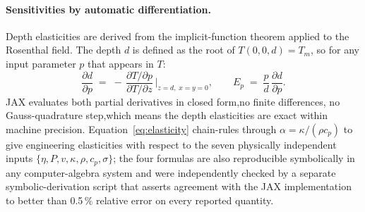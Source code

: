 \documentclass[11pt,a4paper]{article}
\begin{document}
\paragraph{Sensitivities by automatic differentiation.}
Depth elasticities are derived from the implicit-function theorem applied to the Rosenthal field. The depth $d$ is defined as the root of $T(0,0,d) = T_m$, so for any input parameter $p$ that appears in $T$:
\begin{equation}
  \frac{\partial d}{\partial p} \;=\;
    -\,\frac{\partial T/\partial p}{\partial T/\partial z}\,\bigg|_{z=d,\;x=y=0},
  \qquad
  E_p \;=\; \frac{p}{d}\,\frac{\partial d}{\partial p}.
  \label{eq:elasticity}
\end{equation}
JAX evaluates both partial derivatives in closed form,no finite differences, no Gauss-quadrature step,which means the depth elasticities are exact within machine precision. Equation~\ref{eq:elasticity} chain-rules through $\alpha = \kappa/(\rho c_p)$ to give engineering elasticities with respect to the seven physically independent inputs $\{\eta, P, v, \kappa, \rho, c_p, \sigma\}$; the four formulas are also reproducible symbolically in any computer-algebra system and were independently checked by a separate symbolic-derivation script that asserts agreement with the JAX implementation to better than 0.5\,\% relative error on every reported quantity.
\end{document}
